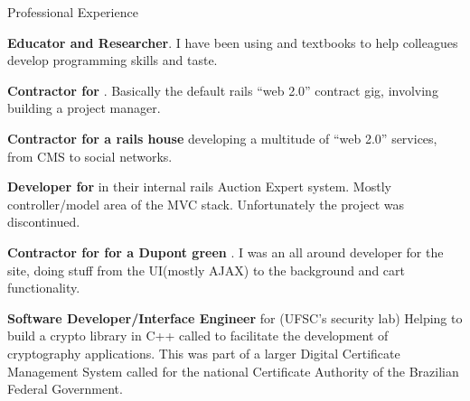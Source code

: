 \begin{rubric}{Professional Experience}{



    \entry*[2009]
        \textbf{Educator and Researcher}. I have been using 
         and
        textbooks to help colleagues develop programming skills and taste.

    \entry*[2009] 
        \textbf{Contractor for
        }. Basically the
        default rails ``web 2.0'' contract gig, involving building a project
        manager.

    \entry*[2007 - 2008] 
        \textbf{Contractor for  a rails house} 
        developing a multitude of ``web 2.0'' services, from CMS to social networks.

    \entry*[2007] 
        \textbf{Developer for } 
        in their internal rails Auction Expert system. Mostly controller/model area of
        the MVC stack. Unfortunately the project was discontinued.

    \entry*[2007] 
        \textbf{Contractor for  
        for a Dupont green }.
        I was an all around developer for the site, doing stuff from the
        UI(mostly AJAX) to the background and cart functionality.

    \entry*[2005 - 2007] 
        \textbf{Software Developer/Interface Engineer} for
        (UFSC's security
        lab) Helping to build a crypto library in C++ called
        to facilitate the development of cryptography applications. This was
        part of a larger Digital Certificate Management System  called
         for the
        national Certificate Authority of the Brazilian Federal Government.

}\end{rubric}

